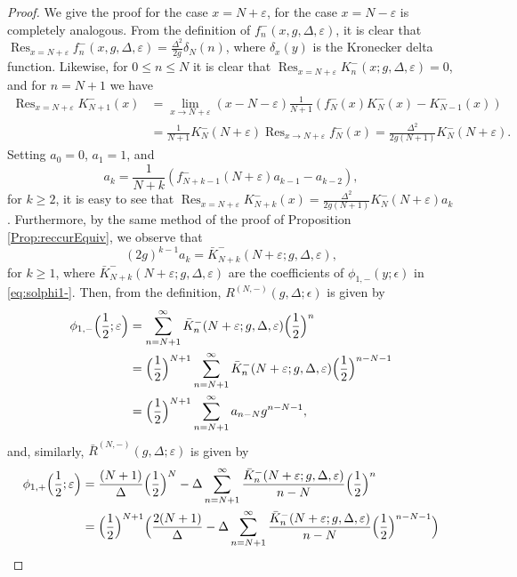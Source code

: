 \documentclass[11pt]{article}
\numberwithin{equation}{section}
\newcommand{\e}{\varepsilon}
\DeclareMathOperator*{\Res}{Res} %
\theoremstyle{plain}
\theoremstyle{definition}
\theoremstyle{remark}
\begin{document}
\begin{proof}
  We give the proof for the case \(x= N + \e\), for the case \(x = N-\e \) is completely analogous.
  From the definition of \(f_n^-(x,g,\Delta,\e)\), it is clear that
  \(  \Res_{x = N +\e} f_n^-(x,g,\Delta,\e) = \frac{\Delta^2}{2g} \delta_N (n) \), where \(\delta_x(y) \) is the Kronecker delta function.
  Likewise,  for \( 0 \leq n \leq N\) it is clear that \( \Res_{x = N +\e} K_n^-(x;g,\Delta,\e) = 0 \), and for \(n = N+1\) we have
  \begin{align*}
    \Res_{x= N+\e} K_{N+1}^-(x) &=  \lim_{x \to N+\e} (x - N -\e) \frac{1}{N+1} \left( f_N^{-}(x)K_N^-(x) - K^{-}_{N-1}(x) \right) \\
                                & = \frac{1}{N+1} K_N^{-}(N+\e) \Res_{x\to N+\e}f_N^-(x)  = \frac{\Delta^2}{2g(N+1)} K_N^{-}(N+\e).
  \end{align*}
  Setting $a_0=0$, $a_1 = 1$, and
  \[
     a_k = \frac{1}{N+k}\left( f_{N+k-1}^-(N+\e) a_{k-1} - a_{k-2} \right),
   \]
   for \(k \geq 2\), it is easy to see that \(\Res_{x= N+ \e} K_{N+k}^-(x) = \frac{\Delta^2}{2 g (N+1)} K_N^-(N+\e) a_k\).
   Furthermore, by the same method of the proof of Proposition \ref{Prop:reccurEquiv}, we observe that
   \[
     (2g)^{k-1} a_k  = \bar{K}_{N+k}^{-}(N+\e;g,\Delta,\e),
   \]
   for \(k \geq 1\), where \(\bar{K}_{N+k}^{-}(N+\e;g,\Delta,\e)\) are the coefficients of \(\phi_{1,-}(y;\epsilon)\) in \eqref{eq:solphi1-}.
   Then, from the definition, \(R^{(N,-)}(g,\Delta;\epsilon)\) is given by
   \begin{align*}
     \phi_{1,-}\Bigl(\frac12;\e\Bigr) &= \sum_{n = N+1}^{\infty} \bar{K}_n^{-}(N+\e;g,\Delta,\e) \Bigl(\frac12\Bigr)^n \\
     &= \Bigl(\frac12\Bigr)^{N+1} \sum_{n = N+1}^{\infty} \bar{K}_n^{-}(N+\e;g,\Delta,\e) \Bigl(\frac12\Bigr)^{n-N-1} \\
     &= \Bigl(\frac12\Bigr)^{N+1} \sum_{n = N+1}^{\infty} a_{n-N} g^{n-N-1},
   \end{align*}
   and, similarly, \(\bar{R}^{(N,-)}(g,\Delta;\e) \) is given by
   \begin{align*}
     \phi_{1,+}\Bigl(\frac12;\e\Bigr) &= \frac{(N+1)}{\Delta}\Bigl(\frac12\Bigr)^N - \Delta \sum_{n = N+1}^{\infty} \frac{\bar{K}_n^{-}(N+\e;g,\Delta,\e)}{n-N} \Bigl(\frac12\Bigr)^n \\
     &= \Bigl(\frac12\Bigr)^{N+1} \Bigl( \frac{2 (N+1)}{\Delta} - \Delta \sum_{n = N+1}^{\infty} \frac{\bar{K}_n^{-}(N+\e;g,\Delta,\e)}{n-N} \Bigl(\frac12\Bigr)^{n-N-1} \Bigr) \\

\end{align*}
\end{proof}
\end{document}
